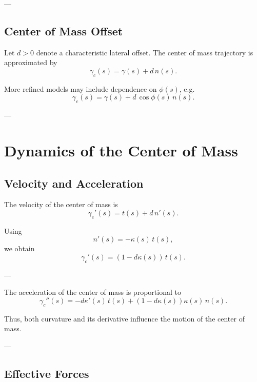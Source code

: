 ---

\subsection{Center of Mass Offset}

\begin{definition}
Let \(d>0\) denote a characteristic lateral offset.
The center of mass trajectory is approximated by
\[
\gamma_c(s)
=
\gamma(s) + d\,n(s).
\]
\end{definition}

\begin{remark}
More refined models may include dependence on \(\phi(s)\), e.g.
\[
\gamma_c(s)
=
\gamma(s) + d\,\cos\phi(s)\,n(s).
\]
\end{remark}


---

\section{Dynamics of the Center of Mass}

\subsection{Velocity and Acceleration}

\begin{proposition}
The velocity of the center of mass is
\[
\gamma_c'(s)
=
t(s) + d\,n'(s).
\]
\end{proposition}

\begin{remark}
Using
\[
n'(s) = -\kappa(s)\,t(s),
\]
we obtain
\[
\gamma_c'(s)
=
(1 - d\kappa(s))\,t(s).
\]
\end{remark}

---

\begin{proposition}
The acceleration of the center of mass is proportional to
\[
\gamma_c''(s)
=
- d\kappa'(s)\,t(s)
+
(1 - d\kappa(s))\kappa(s)\,n(s).
\]
\end{proposition}

\begin{remark}
Thus, both curvature and its derivative influence the motion of the
center of mass.
\end{remark}

---

\subsection{Effective Forces}

